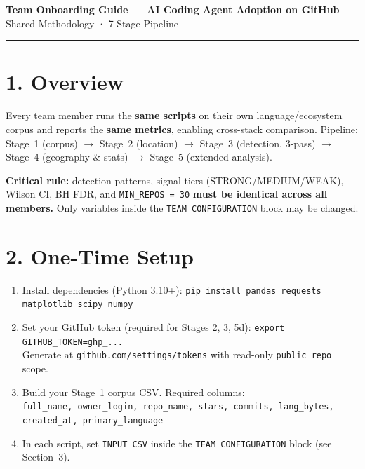\documentclass[10pt,a4paper]{article}
\begin{document}
\begin{center}
  {\large\bfseries Team Onboarding Guide --- AI Coding Agent Adoption on GitHub}\\[2pt]
  {\small Shared Methodology · 7-Stage Pipeline}
\end{center}
\noindent\rule{\linewidth}{0.6pt}

\section*{1. Overview}

Every team member runs the \textbf{same scripts} on their own language/ecosystem corpus
and reports the \textbf{same metrics}, enabling cross-stack comparison.
Pipeline: Stage~1 (corpus) $\to$ Stage~2 (location) $\to$ Stage~3 (detection, 3-pass)
$\to$ Stage~4 (geography \& stats) $\to$ Stage~5 (extended analysis).

\noindent\textbf{Critical rule:} detection patterns, signal tiers (STRONG/MEDIUM/WEAK),
Wilson CI, BH FDR, and \texttt{MIN\_REPOS = 30} \textbf{must be identical across all members.}
Only variables inside the \texttt{TEAM CONFIGURATION} block may be changed.

\section*{2. One-Time Setup}

\begin{enumerate}
  \item Install dependencies (Python 3.10+): \quad
        \lstinline|pip install pandas requests matplotlib scipy numpy|
  \item Set your GitHub token (required for Stages 2, 3, 5d): \quad
        \lstinline|export GITHUB_TOKEN=ghp_...|\\
        Generate at \texttt{github.com/settings/tokens} with read-only \texttt{public\_repo} scope.
  \item Build your Stage~1 corpus CSV. Required columns:\\
        \texttt{full\_name, owner\_login, repo\_name, stars, commits, lang\_bytes, created\_at, primary\_language}
  \item In each script, set \texttt{INPUT\_CSV} inside the \texttt{TEAM CONFIGURATION} block (see Section~3).
\end{enumerate}
\end{document}

